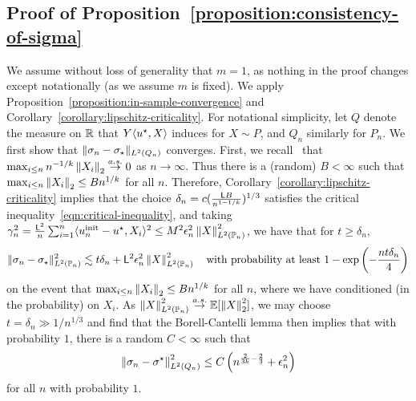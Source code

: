 \subsection{Proof of Proposition~\ref{proposition:consistency-of-sigma}}
\label{sec:proof-consistency-of-sigma}

We assume without loss of generality that $m = 1$, as nothing in the
proof changes except notationally (as we assume $m$ is fixed).
We apply Proposition~\ref{proposition:in-sample-convergence} and
Corollary~\ref{corollary:lipschitz-criticality}.  For
notational simplicity, let $Q$ denote the measure
on $\mathbb{R}$ that $Y \langle u^\star, X\rangle$ induces for $X \sim P$, and $Q_n$ similarly for
$P_n$.
We first show that
$\|{\sigma_n - \sigma_\star}\|_{L^2(Q_n)}$ converges.  First, we
recall~\cite[Lemma 3]{Owen90} that $\max_{i \le n} n^{-1/k} \left\|{X_i}\right\|_2 \stackrel{a.s.}{\rightarrow}
0$ as $n \to \infty$. Thus there is a (random) $B < \infty$ such that
$\max_{i \le n} \left\|{X_i}\right\|_2 \le B n^{1/k}$ for all $n$. Therefore,
Corollary~\ref{corollary:lipschitz-criticality} implies that the choice
$\delta_n = c (\frac{\mathsf{L} B}{n^{1-1/k}})^{1/3}$ satisfies the critical
inequality~\eqref{eqn:critical-inequality}, and taking $\gamma^2_n =
\frac{\mathsf{L}^2}{n} \sum_{i = 1}^n \langle u_n^{\textup{init}} - u^\star, X_i\rangle^2 \le M^2 \epsilon_n^2
\left\|{X}\right\|_{L^2(\mathbb{P}_n)}^2$, we have that for $t \ge \delta_n$,
\begin{equation*}
  \|{\sigma_n - \sigma_\star}\|_{L^2(\mathbb{P}_n)}^2
  \lesssim t \delta_n + \mathsf{L}^2 \epsilon_n^2 \left\|{X}\right\|_{L^2(\mathbb{P}_n)}^2
  ~~~ \mbox{with~probability~at~least}~
  1 - \exp\left(-\frac{n t \delta_n}{4}\right)
\end{equation*}
on the event that $\max_{i \le n} \left\|{X_i}\right\|_2 \le B n^{1/k}$ for all $n$,
where we have conditioned (in the probability) on $X_i$.
As $\left\|{X}\right\|_{L^2(\mathbb{P}_n)}^2 \stackrel{a.s.}{\rightarrow} \mathbb{E}[\left\|{X}\right\|_2^2]$, we may choose
$t = \delta_n \gg 1/n^{1/3}$ and find that the Borell-Cantelli lemma
then implies that with probability $1$, there is a random $C < \infty$
such that
\begin{equation}
  \label{eqn:ltwopn-sigma-converge}
  \left\|{\sigma_n - \sigma^\star}\right\|_{L^2(Q_n)}^2 \le C \left(
  n^{\frac{2}{3k} - \frac{2}{3}} + \epsilon_n^2 \right)
\end{equation}
for all $n$ with probability $1$.

